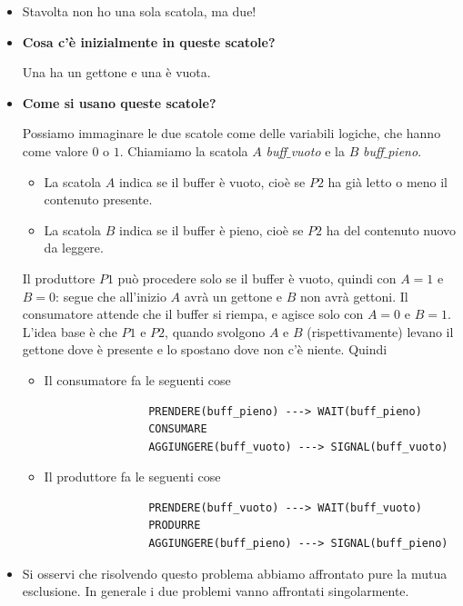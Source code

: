 \begin{itemize}
	\item Stavolta non ho una sola scatola, ma due! 
	\item \textbf{Cosa c'è inizialmente in queste scatole?}  
	
	Una ha un gettone e una è vuota.
	
	\item\textbf{Come si usano queste scatole?}
	
	Possiamo immaginare le due scatole come delle variabili logiche, che hanno come valore $0$ o $1$. Chiamiamo la scatola $A$ \emph{buff$\_$vuoto} e la $B$ \emph{buff$\_$pieno}.
	\begin{itemize}
		\item La scatola $A$ indica se il buffer è vuoto, cioè se $P2$ ha già letto o meno il contenuto presente.
		\item La scatola $B$ indica se il buffer è pieno, cioè se $P2$ ha del contenuto nuovo da leggere.
	\end{itemize}
	Il produttore $P1$ può procedere solo se il buffer è vuoto, quindi con $A=1$ e $B=0$: segue che all'inizio $A$ avrà un gettone e $B$ non avrà gettoni. Il consumatore attende che il buffer si riempa, e agisce solo con $A=0$ e $B=1$. L'idea base è che $P1$ e $P2$, quando svolgono $A$ e $B$ (rispettivamente) levano il gettone dove è presente e lo spostano dove non c'è niente. Quindi
	\begin{itemize}
		\item Il consumatore fa le seguenti cose
		{
			\small \begin{verbatim}
				PRENDERE(buff_pieno) ---> WAIT(buff_pieno)
				CONSUMARE
				AGGIUNGERE(buff_vuoto) ---> SIGNAL(buff_vuoto)
		\end{verbatim}
	}
		\item Il produttore fa le seguenti cose
		{
			\small \begin{verbatim}
				PRENDERE(buff_vuoto) ---> WAIT(buff_vuoto)
				PRODURRE
				AGGIUNGERE(buff_pieno) ---> SIGNAL(buff_pieno)
		\end{verbatim}
	}
	\end{itemize}
	\item Si osservi che risolvendo questo problema abbiamo affrontato pure la mutua esclusione. In generale i due problemi vanno affrontati singolarmente.
\end{itemize}